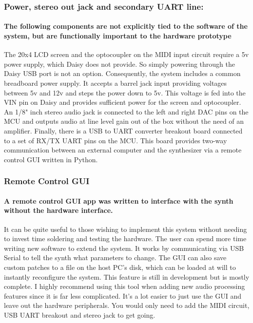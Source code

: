 \documentclass[acmlarge,screen]{acmart}
\begin{document}
	\subsubsection{Power, stereo out jack and secondary UART line:}
	\paragraph{The following components are not explicitly tied to the software of the system, but are functionally important to the hardware prototype} The 20x4 LCD screen and the optocoupler on the MIDI input circuit require a 5v power supply, which Daisy does not provide. So simply powering through the Daisy USB port is not an option. Consequently, the system includes a common breadboard power supply. It accepts a barrel jack input providing voltages between 5v and 12v and steps the power down to 5v. This voltage is fed into the VIN pin on Daisy and provides sufficient power for the screen and optocoupler. An 1/8" inch stereo audio jack is connected to the left and right DAC pins on the MCU and outputs audio at line level gain out of the box without the need of an amplifier. Finally, there is a USB to UART converter breakout board connected to a set of RX/TX UART pins on the MCU. This board provides two-way communication between an external computer and the synthesizer via a remote control GUI written in Python.
	
	\subsubsection{Remote Control GUI}
	\paragraph{A remote control GUI app was written to interface with the synth without the hardware interface.} It can be quite useful to those wishing to implement this system without needing to invest time soldering and testing the hardware. The user can spend more time writing new software to extend the system. It works by communicating via USB Serial to tell the synth what parameters to change. The GUI can also save custom patches to a file on the host PC's disk, which can be loaded at will to instantly reconfigure the system. This feature is still in development but is mostly complete. I highly recommend using this tool when adding new audio processing features since it is far less complicated. It's a lot easier to just use the GUI and leave out the hardware peripherals. You would only need to add the MIDI circuit, USB UART breakout and stereo jack to get going.
\end{document}
